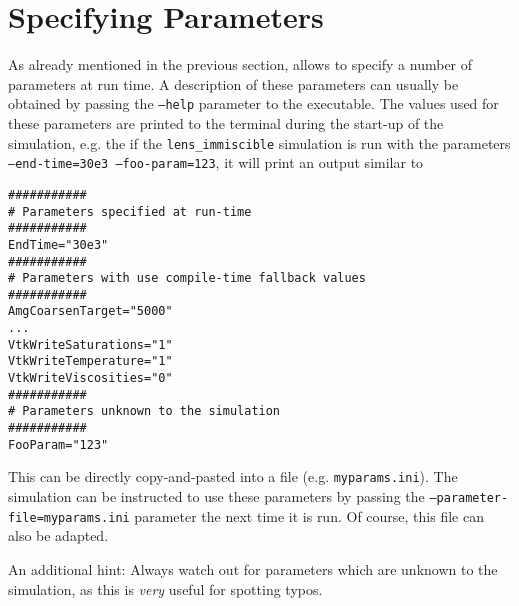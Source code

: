 \section{Specifying Parameters}
\label{sec:inputFiles}

As already mentioned in the previous section, \eWoms allows to specify
a number of parameters at run time. A description of these parameters
can usually be obtained by passing the \texttt{--help} parameter to the
executable. The values used for these parameters are printed to the
terminal during the start-up of the simulation, e.g. the if the \texttt{lens\_immiscible}
simulation is run with the parameters \texttt{--end-time=30e3 --foo-param=123}, it will print an output similar to
\begin{lstlisting}[style=Bash]
###########
# Parameters specified at run-time
###########
EndTime="30e3"
###########
# Parameters with use compile-time fallback values
###########
AmgCoarsenTarget="5000"
...
VtkWriteSaturations="1"
VtkWriteTemperature="1"
VtkWriteViscosities="0"
###########
# Parameters unknown to the simulation
###########
FooParam="123"
\end{lstlisting}

This can be directly copy-and-pasted into a file
(e.g. \texttt{myparams.ini}). The simulation can be instructed to use
these parameters by passing the \texttt{--parameter-file=myparams.ini}
parameter the next time it is run. Of course, this file can also be
adapted.

An additional hint: Always watch out for parameters which are unknown
to the simulation, as this is \emph{very} useful for spotting typos.

